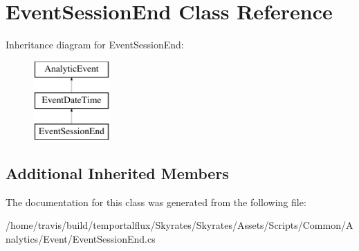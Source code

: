 \hypertarget{class_event_session_end}{\section{Event\-Session\-End Class Reference}
\label{class_event_session_end}
}
Inheritance diagram for Event\-Session\-End\-:\begin{figure}[H]
\begin{center}
\leavevmode
\includegraphics[height=3.000000cm]{class_event_session_end}
\end{center}
\end{figure}
\subsection*{Additional Inherited Members}


The documentation for this class was generated from the following file\-:\begin{DoxyCompactItemize}
\item 
/home/travis/build/temportalflux/\-Skyrates/\-Skyrates/\-Assets/\-Scripts/\-Common/\-Analytics/\-Event/Event\-Session\-End.\-cs\end{DoxyCompactItemize}
